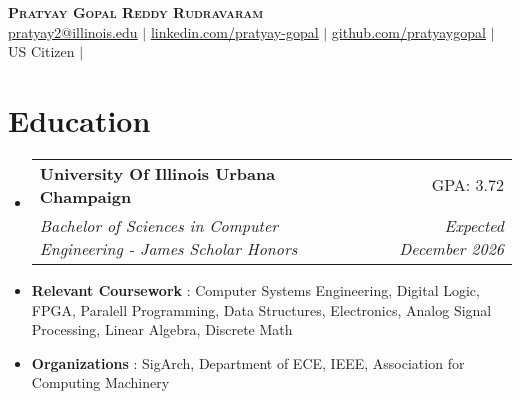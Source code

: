 \documentclass[letterpaper,11pt]{article}
\makeatletter
\newcommand{\resumeSubheading}[4]{
  \vspace{-2pt}\item
    \begin{tabular*}{0.97\textwidth}[t]{l@{\extracolsep{\fill}}r}
      \textbf{#1} & #2 \\
      \textit{\small#3} & \textit{\small #4} \\
    \end{tabular*}\vspace{-7pt}
}
\newcommand{\resumeSubHeadingListStart}{\begin{itemize}[leftmargin=0.15in, label={}]}
\newcommand{\resumeSubHeadingListEnd}{\end{itemize}}
\makeatother
\begin{document}

\begin{center}
    \textbf{\Huge \scshape Pratyay Gopal Reddy Rudravaram} \\ \vspace{1pt}
    \href{mailto:pratyay2@illinois.edu}{\underline{pratyay2@illinois.edu}} $|$ 
    \href{https://linkedin.com/in/pratyay-gopal}{\underline{linkedin.com/pratyay-gopal}} $|$
    \href{https://github.com/pratyaygopal}{\underline{github.com/pratyaygopal}} $|$
    \small US Citizen $|$ 
\end{center}

    \vspace{-20pt}



\section{Education}
  \resumeSubHeadingListStart
    \resumeSubheading
      {University Of Illinois Urbana Champaign}{GPA: 3.72}
      {Bachelor of Sciences in Computer Engineering - James Scholar Honors}{Expected December 2026}
    
  \resumeSubHeadingListEnd
    \begin{itemize}
    \setlength\itemsep{-5pt}
    \item \textbf{Relevant Coursework} : Computer Systems Engineering, Digital Logic, FPGA, Paralell Programming, Data Structures, Electronics, Analog Signal Processing, Linear Algebra, Discrete Math
    \item \textbf{Organizations} : SigArch, Department of ECE, IEEE, Association for Computing Machinery
    \end{itemize}

    \vspace{-15pt}

\end{document}
